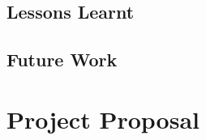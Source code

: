 \documentclass[12pt,notitlepage,twoside]{scrreprt}
\begin{document}
\section{Lessons Learnt}
\section{Future Work}
\cleardoublepage



\cleardoublepage

\appendix

\chapter{Project Proposal}
\label{prop}

%
\end{document}
